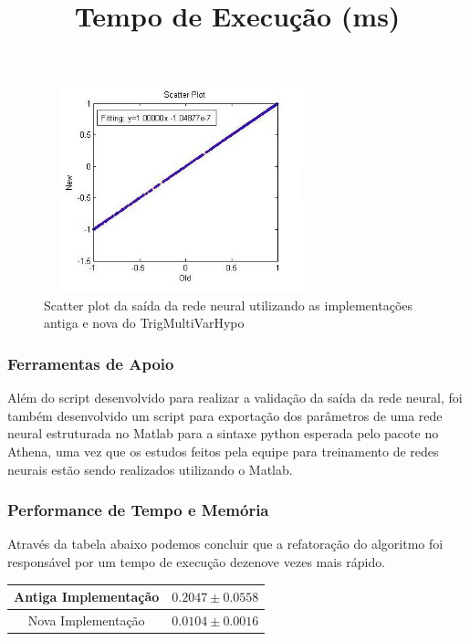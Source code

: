 \documentclass[a4paper,10pt,titlepage]{article}
\begin{document}
\begin{figure}[htbp!]
 \centering
 \includegraphics[width=8cm,height=6cm]{Figs/tmvh_refactoring/new_tmvh_splot.jpeg}
 \caption{Scatter plot da saída da rede neural utilizando as implementações antiga e nova do TrigMultiVarHypo}
 \label{fig:new_tmvh_splot}
\end{figure}


\subsubsection{Ferramentas de Apoio}

Além do script desenvolvido para realizar a validação da saída da rede neural, foi também desenvolvido um script para exportação dos parâmetros de uma rede neural estruturada no Matlab para a sintaxe python esperada pelo pacote no Athena, uma vez que os estudos feitos pela equipe para treinamento de redes neurais estão sendo realizados utilizando o Matlab.

\subsubsection{Performance de Tempo e Memória}

Através da tabela abaixo podemos concluir que a refatoração do algoritmo foi responsável por um tempo de execução dezenove vezes mais rápido.

\begin{table}[htbp!]
 \centering

 \title{\textbf{Tempo de Execução (ms)}}

 \begin{tabular}{cc}
  \hline Antiga Implementação & $ 0.2047 \pm 0.0558 $\\
  \hline Nova Implementação & $ 0.0104 \pm 0.0016 $\\
 \end{tabular}
\end{table}
\end{document}
